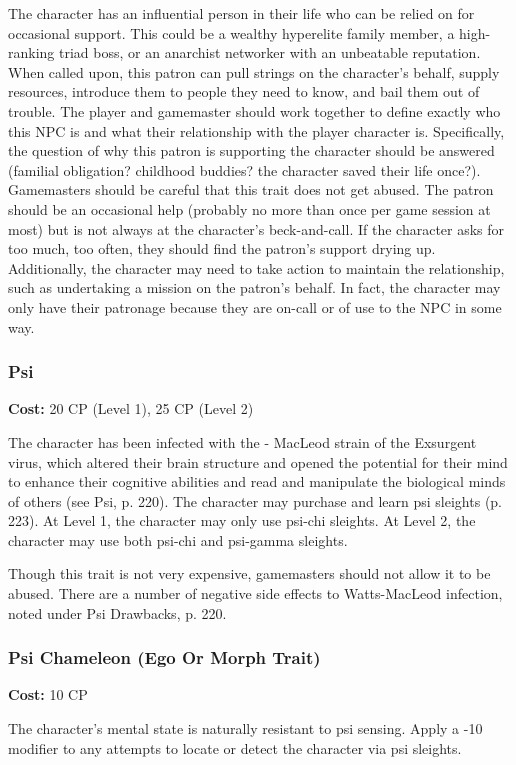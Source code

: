 The character has an influential person in their life who can be relied on for
occasional support.  This could be a wealthy hyperelite family member, a
high-ranking triad boss, or an anarchist networker with an unbeatable
reputation. When called upon, this patron can pull strings on the character’s
behalf, supply resources, introduce them to people they need to know, and bail
them out of trouble. The player and gamemaster should work together to define
exactly who this NPC is and what their relationship with the player character
is. Specifically, the question of why this patron is supporting the character
should be answered (familial obligation? childhood buddies?  the character
saved their life once?). Gamemasters should be careful that this trait does not
get abused.  The patron should be an occasional help (probably no more than
once per game session at most) but is not always at the character’s
beck-and-call. If the character asks for too much, too often, they should find
the patron’s support drying up. Additionally, the character may need to take
action to maintain the relationship, such as undertaking a mission on the
patron’s behalf. In fact, the character may only have their patronage because
they are on-call or of use to the NPC in some way.

\subsubsection{Psi}
\textbf{Cost:} 20 CP (Level 1), 25 CP (Level 2)

The character has been infected with the - MacLeod strain of the Exsurgent
virus, which altered their brain structure and opened the potential for their
mind to enhance their cognitive abilities and read and manipulate the
biological minds of others (see Psi, p. 220). The character may purchase and
learn psi sleights (p. 223). At Level 1, the character may only use psi-chi
sleights. At Level 2, the character may use both psi-chi and psi-gamma
sleights.

Though this trait is not very expensive, gamemasters should not allow it to be
abused. There are a number of negative side effects to Watts-MacLeod infection,
noted under Psi Drawbacks, p. 220.

\subsubsection{Psi Chameleon (Ego Or Morph Trait)}
\textbf{Cost:} 10 CP

The character’s mental state is naturally resistant to psi sensing. Apply a -10
modifier to any attempts to locate or detect the character via psi sleights.

